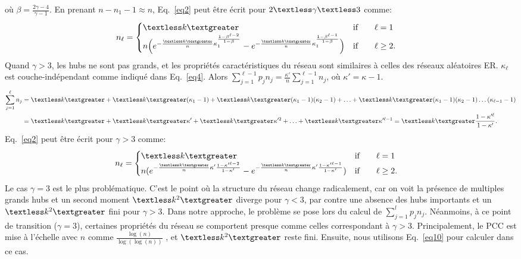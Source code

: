où $\beta=\frac{2\gamma-4}{\gamma-1}$. En prenant $n-n_1-1 \approx n$, Eq.~\eqref{eq2} peut être écrit pour $2\textless \gamma \textless 3$ comme:
\begin{align}
n_{\ell} &=
\begin{cases}
\km & \text{if}\qquad \ell=1 \\
n\Big(e^{-\frac{\km}{n}\kappa_1^{\frac{1-\beta^{\ell-2}}{1-\beta}}}-e^{-\frac{\km}{n}\kappa_1^{\frac{1-\beta^{\ell-1}}{1-\beta}}}\Big) & \text{if}\qquad \ell \ge 2.
\end{cases}
\label{eq8}
\end{align}
Quand $\gamma> 3 $, les hubs ne sont pas grands, et les propriétés caractéristiques du réseau sont similaires à celles des réseaux aléatoires ER.
 $\kappa_{\ell}$ est couche-indépendant comme indiqué dans Eq.~\eqref{eq4}.
Alors $\sum_{j=1}^{\ell-1}p_j n_j=\frac{\kappa'}{n}\sum_{j=1}^{\ell-1}n_j$, où $\kappa'=\kappa-1$.  
\begin{align}
\sum_{j=1}^{\ell}n_j &=\km+\km(\kappa_1-1)+\km(\kappa_1-1)(\kappa_2-1)+\ldots+\km(\kappa_1-1)(\kappa_2-1)\ldots(\kappa_{\ell-1}-1) \nonumber\\
&=\km+\km\kappa'+\km\kappa'^2+\ldots+\km\kappa'^{\ell-1}=\km\frac{1-\kappa'^{\ell}}{1-\kappa'}. 
\label{eq9}
\end{align}
Eq.~\eqref{eq2} peut être écrit pour $\gamma>3$ comme:
\begin{align}
n_{\ell} &=
\begin{cases}
\textless k \textgreater & \text{if}\qquad \ell=1 \\
n(e^{-\frac{\textless k \textgreater}{n}\kappa'\frac{1-\kappa'^{\ell-2}}{1-\kappa'}}-e^{-\frac{\km}{n}\kappa'\frac{1-\kappa'^{\ell-1}}{1-\kappa'}}) & \text{if}\qquad \ell \ge 2.
\end{cases}
\label{eq10}
\end{align}
Le cas $\gamma=3$ est le plus problématique. C'est le point où la structure du réseau change radicalement, car on voit la présence de multiples grands hubs et un second moment  $\textless k^2 \textgreater$ diverge pour $\gamma<3$, par contre une absence des hubs importants et un $\textless k^2  \textgreater$ fini pour $\gamma>3$.
Dans notre approche, le problème se pose lors du calcul de $\sum_{j=1}^{l}p_jn_j$. Néanmoins, à ce point de transition ($\gamma=3$), certaines propriétés du réseau se comportent presque comme celles correspondant à $\gamma>3$.
Principalement, le PCC est mise à l'échelle avec $n$ comme $\frac {\log(n)}{\log(\log(n))}$ \cite{Bollobas-Riordan2004}, et $\textless k^2  \textgreater$ reste fini. Ensuite, nous utilisons Eq.~\eqref{eq10} pour calculer \nl dans ce cas. \\
